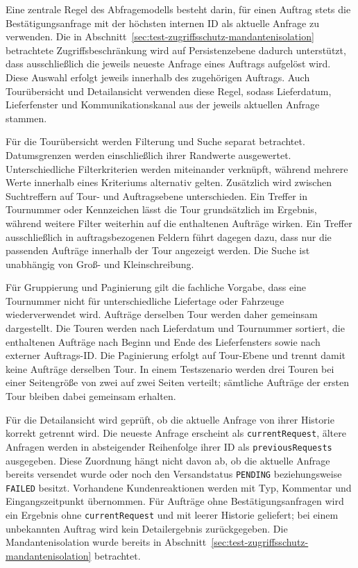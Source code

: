 \documentclass[
  12pt,
  a4paper,
  oneside
]{article}
\begin{document}
Eine zentrale Regel des Abfragemodells besteht darin, für einen Auftrag stets
die Bestätigungsanfrage mit der höchsten internen ID als aktuelle Anfrage zu
verwenden. Die in
Abschnitt~\ref{sec:test-zugriffsschutz-mandantenisolation} betrachtete
Zugriffsbeschränkung wird auf Persistenzebene dadurch unterstützt, dass
ausschließlich die jeweils neueste Anfrage eines Auftrags aufgelöst wird. Diese
Auswahl erfolgt jeweils innerhalb des zugehörigen Auftrags. Auch Tourübersicht
und Detailansicht verwenden diese Regel, sodass Lieferdatum, Lieferfenster und
Kommunikationskanal aus der jeweils aktuellen Anfrage stammen.

Für die Tourübersicht werden Filterung und Suche separat betrachtet.
Datumsgrenzen werden einschließlich ihrer Randwerte ausgewertet.
Unterschiedliche Filterkriterien werden miteinander verknüpft, während mehrere
Werte innerhalb eines Kriteriums alternativ gelten. Zusätzlich wird zwischen
Suchtreffern auf Tour- und Auftragsebene unterschieden. Ein Treffer in
Tournummer oder Kennzeichen lässt die Tour grundsätzlich im Ergebnis, während
weitere Filter weiterhin auf die enthaltenen Aufträge wirken. Ein Treffer
ausschließlich in auftragsbezogenen Feldern führt dagegen dazu, dass nur die
passenden Aufträge innerhalb der Tour angezeigt werden. Die Suche ist
unabhängig von Groß- und Kleinschreibung.

Für Gruppierung und Paginierung gilt die fachliche Vorgabe, dass eine Tournummer
nicht für unterschiedliche Liefertage oder Fahrzeuge wiederverwendet wird.
Aufträge derselben Tour werden daher gemeinsam dargestellt. Die Touren werden
nach Lieferdatum und Tournummer sortiert, die enthaltenen Aufträge nach Beginn
und Ende des Lieferfensters sowie nach externer Auftrags-ID. Die Paginierung
erfolgt auf Tour-Ebene und trennt damit keine Aufträge derselben Tour. In einem
Testszenario werden drei Touren bei einer Seitengröße von zwei auf zwei Seiten
verteilt; sämtliche Aufträge der ersten Tour bleiben dabei gemeinsam erhalten.

Für die Detailansicht wird geprüft, ob die aktuelle Anfrage von ihrer Historie
korrekt getrennt wird. Die neueste Anfrage erscheint als
\texttt{currentRequest}, ältere Anfragen werden in absteigender Reihenfolge
ihrer ID als \texttt{previousRequests} ausgegeben. Diese Zuordnung hängt nicht
davon ab, ob die aktuelle Anfrage bereits versendet wurde oder noch den
Versandstatus \texttt{PENDING} beziehungsweise \texttt{FAILED} besitzt.
Vorhandene Kundenreaktionen werden mit Typ, Kommentar und Eingangszeitpunkt
übernommen. Für Aufträge ohne Bestätigungsanfragen wird ein Ergebnis ohne
\texttt{currentRequest} und mit leerer Historie geliefert; bei einem unbekannten
Auftrag wird kein Detailergebnis zurückgegeben. Die Mandantenisolation wurde
bereits in Abschnitt~\ref{sec:test-zugriffsschutz-mandantenisolation}
betrachtet.
\end{document}
